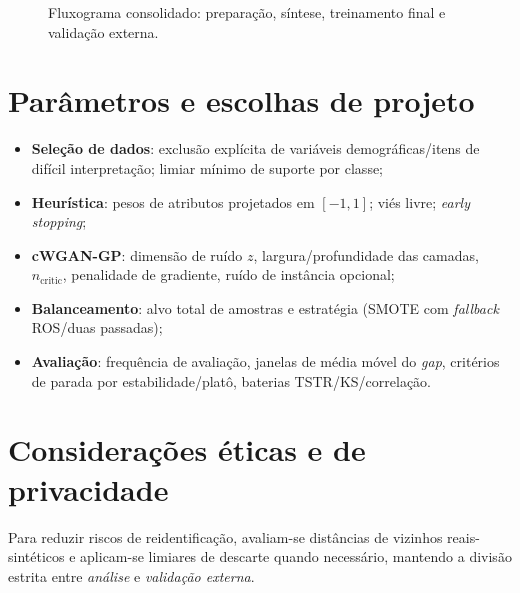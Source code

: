 \documentclass[12pt,a4paper]{article}
\begin{document}
\begin{figure}[h!]
\caption{Fluxograma consolidado: preparação, síntese, treinamento final e validação externa.}
\end{figure}

\section{Parâmetros e escolhas de projeto}
\begin{itemize}[leftmargin=1.5em]
    \item \textbf{Seleção de dados}: exclusão explícita de variáveis demográficas/itens de difícil interpretação; limiar mínimo de suporte por classe;
    \item \textbf{Heurística}: pesos de atributos projetados em $[-1,1]$; viés livre; \emph{early stopping};
    \item \textbf{cWGAN-GP}: dimensão de ruído $z$, largura/profundidade das camadas, $n_{\text{critic}}$, penalidade de gradiente, ruído de instância opcional;
    \item \textbf{Balanceamento}: alvo total de amostras e estratégia (SMOTE com \emph{fallback} ROS/duas passadas);
    \item \textbf{Avaliação}: frequência de avaliação, janelas de média móvel do \emph{gap}, critérios de parada por estabilidade/platô, baterias TSTR/KS/correlação.
\end{itemize}

\section{Considerações éticas e de privacidade}
Para reduzir riscos de reidentificação, avaliam-se distâncias de vizinhos reais-sintéticos e aplicam-se limiares de descarte quando necessário, mantendo a divisão estrita entre \emph{análise} e \emph{validação externa}.
\end{document}
